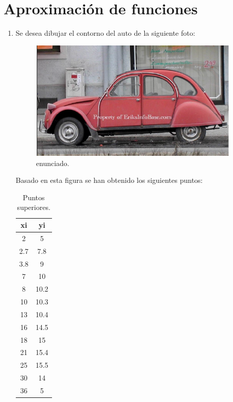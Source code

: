 \documentclass{udpreport}
\begin{document}
\chapter{Aproximación de funciones} 
\begin{enumerate}
    
\vspace{0.9cm}
\item 

Se desea dibujar el contorno del auto de la siguiente foto:

\begin{figure}[H]
    \centering
    \includegraphics[width=10cm]{enun1}
    \caption{enunciado.} \label{fig:enun1}
\end{figure}


Basado en esta figura se han obtenido los siguientes puntos:



\begin{table}[H]
    \centering
        \begin{tabular} { |c|c|}
        
        \hline
        xi  &  yi\\
        \hline
        2 &  5       \\
         \hline
        2.7 &  7.8        \\
         \hline
        3.8 &  9        \\
         \hline
        7 &  10        \\
         \hline
        8 &  10.2        \\
         \hline
        10 & 10.3        \\
         \hline
        13 & 10.4          \\
         \hline
        16 &  14.5        \\
         \hline
        18 &  15       \\
         \hline
        21 &  15.4        \\
         \hline
        25 &  15.5       \\
         \hline
        30 &  14       \\
        \hline
        36& 5   \\
        \hline
        \end{tabular}
        \caption{Puntos superiores.}
    \end{table}
 \vspace{1.8cm}
 

\end{enumerate}
\end{document}
